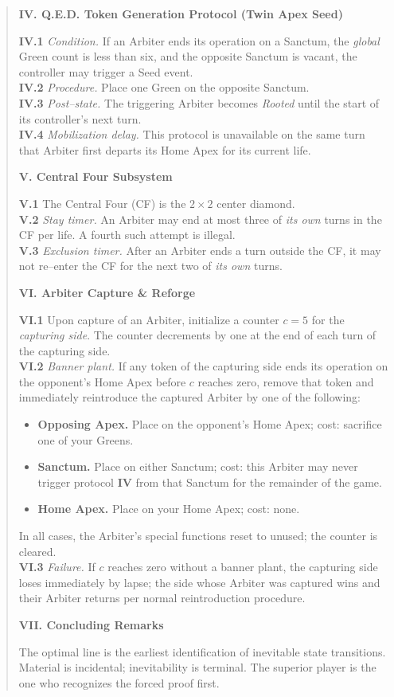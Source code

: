\documentclass[11pt]{article}
\begin{document}
\begin{quote}
\medskip
\textbf{IV. Q.E.D. Token Generation Protocol (Twin Apex Seed)}

\textbf{IV.1} \textit{Condition.} If an Arbiter ends its operation on a Sanctum, the \emph{global} Green count is less than six, and the opposite Sanctum is vacant, the controller may trigger a Seed event.\\
\textbf{IV.2} \textit{Procedure.} Place one Green on the opposite Sanctum.\\
\textbf{IV.3} \textit{Post--state.} The triggering Arbiter becomes \emph{Rooted} until the start of its controller’s next turn.\\
\textbf{IV.4} \textit{Mobilization delay.} This protocol is unavailable on the same turn that Arbiter first departs its Home Apex for its current life.

\medskip
\textbf{V. Central Four Subsystem}

\textbf{V.1} The Central Four (CF) is the $2\times2$ center diamond.\\
\textbf{V.2} \textit{Stay timer.} An Arbiter may end at most three of \emph{its own} turns in the CF per life. A fourth such attempt is illegal.\\
\textbf{V.3} \textit{Exclusion timer.} After an Arbiter ends a turn outside the CF, it may not re--enter the CF for the next two of \emph{its own} turns.

\medskip
\textbf{VI. Arbiter Capture \& Reforge}

\textbf{VI.1} Upon capture of an Arbiter, initialize a counter $c=5$ for the \emph{capturing side}. The counter decrements by one at the end of each turn of the capturing side.\\
\textbf{VI.2} \textit{Banner plant.} If any token of the capturing side ends its operation on the opponent’s Home Apex before $c$ reaches zero, remove that token and immediately reintroduce the captured Arbiter by one of the following:
\begin{itemize}\itemsep0.2em
  \item \textbf{Opposing Apex.} Place on the opponent’s Home Apex; cost: sacrifice one of your Greens.
  \item \textbf{Sanctum.} Place on either Sanctum; cost: this Arbiter may never trigger protocol \textbf{IV} from that Sanctum for the remainder of the game.
  \item \textbf{Home Apex.} Place on your Home Apex; cost: none.
\end{itemize}
In all cases, the Arbiter’s special functions reset to unused; the counter is cleared.\\
\textbf{VI.3} \textit{Failure.} If $c$ reaches zero without a banner plant, the capturing side loses immediately by lapse; the side whose Arbiter was captured wins and their Arbiter returns per normal reintroduction procedure.

\medskip
\textbf{VII. Concluding Remarks}

The optimal line is the earliest identification of inevitable state transitions. Material is incidental; inevitability is terminal. The superior player is the one who recognizes the forced proof first.
\end{quote}
\end{document}
